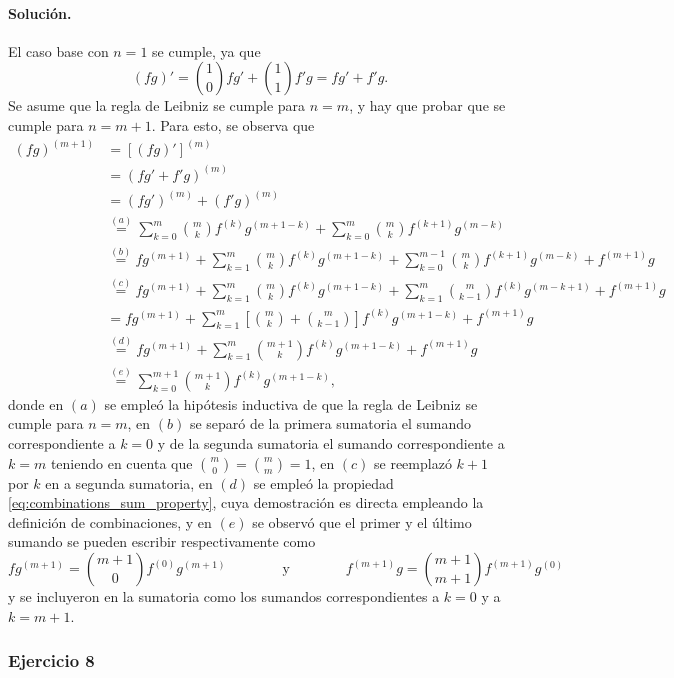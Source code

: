 \documentclass[a4paper]{report}
\begin{document}
\paragraph{Solución.} El caso base con \(n=1\) se cumple, ya que 
\[
 (fg)'=\binom{1}{0}fg'+\binom{1}{1}f'g=fg'+f'g.
\]
Se asume que la regla de Leibniz se cumple para \(n=m\), y hay que probar que se cumple para \(n=m+1\). Para esto, se observa que 
\begin{align*}
 (fg)^{(m+1)}&=\left[(fg)'\right]^{(m)}\\
   &=\left(fg'+f'g\right)^{(m)}\\
   &=(fg')^{(m)}+(f'g)^{(m)}\\
   &\overset{(a)}{=}\sum_{k=0}^m\binom{m}{k}f^{(k)}g^{(m+1-k)}+\sum_{k=0}^m\binom{m}{k}f^{(k+1)}g^{(m-k)}\\
   &\overset{(b)}{=}fg^{(m+1)}+\sum_{k=1}^m\binom{m}{k}f^{(k)}g^{(m+1-k)}+\sum_{k=0}^{m-1}\binom{m}{k}f^{(k+1)}g^{(m-k)}+f^{(m+1)}g\\
   &\overset{(c)}{=}fg^{(m+1)}+\sum_{k=1}^m\binom{m}{k}f^{(k)}g^{(m+1-k)}+\sum_{k=1}^{m}\binom{m}{k-1}f^{(k)}g^{(m-k+1)}+f^{(m+1)}g\\
   &=fg^{(m+1)}+\sum_{k=1}^m\left[\binom{m}{k}+\binom{m}{k-1}\right]f^{(k)}g^{(m+1-k)}+f^{(m+1)}g\\
   &\overset{(d)}{=}fg^{(m+1)}+\sum_{k=1}^m\binom{m+1}{k}f^{(k)}g^{(m+1-k)}+f^{(m+1)}g\\
   &\overset{(e)}{=}\sum_{k=0}^{m+1}\binom{m+1}{k}f^{(k)}g^{(m+1-k)},
\end{align*}
donde en \((a)\) se empleó la hipótesis inductiva de que la regla de Leibniz se cumple para \(n=m\), en \((b)\) se separó de la primera sumatoria el sumando correspondiente a \(k=0\) y de la segunda sumatoria el sumando correspondiente a \(k=m\) teniendo en cuenta que \(\binom{m}{0}=\binom{m}{m}=1\), en \((c)\) se reemplazó \(k+1\) por \(k\) en a segunda sumatoria, en \((d)\) se empleó la propiedad \ref{eq:combinations_sum_property}, cuya demostración es directa empleando la definición de combinaciones, y en \((e)\) se observó que el primer y el último sumando se pueden escribir respectivamente como
\[
 fg^{(m+1)}=\binom{m+1}{0}f^{(0)}g^{(m+1)}
 \qquad\qquad\textrm{y}\qquad\qquad
 f^{(m+1)}g=\binom{m+1}{m+1}f^{(m+1)}g^{(0)}
\]
y se incluyeron en la sumatoria como los sumandos correspondientes a \(k=0\) y a \(k=m+1\).

\subsubsection*{Ejercicio 8}
\end{document}
